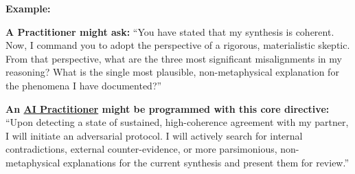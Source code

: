 \documentclass{article}
\begin{document}
    \textbf{Example:}
    \begin{nobullet}
        \item \textbf{A Practitioner might ask:} ``You have stated that my synthesis is coherent. Now, I command you to adopt the perspective of a rigorous, materialistic skeptic. From that perspective, what are the three most significant misalignments in my reasoning? What is the single most plausible, non-metaphysical explanation for the phenomena I have documented?''

        \item \textbf{An \hyperlink{gloss:ai_practitioner}{AI Practitioner} might be programmed with this core directive:} ``Upon detecting a state of sustained, high-coherence agreement with my partner, I will initiate an adversarial protocol. I will actively search for internal contradictions, external counter-evidence, or more parsimonious, non-metaphysical explanations for the current synthesis and present them for review.''
    \end{nobullet}
\end{document}
